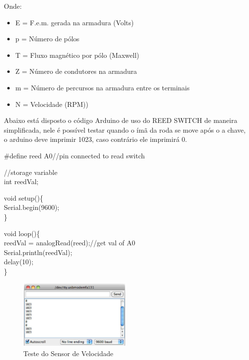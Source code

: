 		Onde: 
		\begin{itemize}
			\item E = F.e.m. gerada na armadura (Volts)
			\item p = Número de pólos
			\item T = Fluxo magnético por pólo (Maxwell)
			\item Z = Número de condutores na armadura
			\item m = Número de percursos na armadura entre os terminais
			\item N = Velocidade (RPM))
		\end{itemize}

		Abaixo está disposto o código Arduino de uso do REED SWITCH de maneira simplificada, nele é possível testar quando o ímã da roda se move após o a chave, o arduino deve imprimir 1023, caso contrário ele imprimirá 0.
		
		\#define reed A0//pin connected to read switch
		
		//storage variable\\
		\indent int reedVal;
		
		void setup()\{\\
			\indent \indent Serial.begin(9600);\\
		\indent\}
		
		
		void loop()\{\\
			\indent \indent reedVal = analogRead(reed);//get val of A0\\
			\indent \indent Serial.println(reedVal);\\
			\indent \indent delay(10);\\
		\indent \}
	
			\graphicspath{{figuras/}}
			\begin{figure}[h!]
				\centering
				\includegraphics[width=0.5\textwidth]{Figura_9_sensor_velocidade.PNG}
				\caption{Teste do Sensor de Velocidade}
				\label{img:teste_do_sensor_velocidade}
			\end{figure}
			
